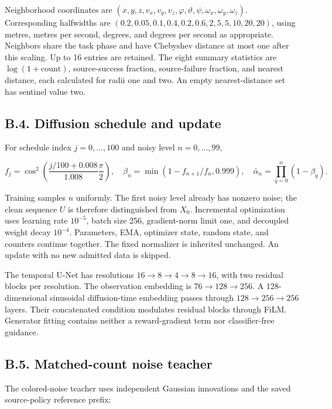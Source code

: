 \documentclass[
  american,
  11pt,
  a4paper,
]{article}
\begin{document}
Neighborhood coordinates are
\((x,y,z,v_x,v_y,v_z,\varphi,\vartheta,\psi,\omega_x,\omega_y,\omega_z)\).
Corresponding halfwidths are
\((0.2,0.05,0.1,0.4,0.2,0.6,2,5,5,10,20,20)\), using metres, metres per
second, degrees, and degrees per second as appropriate. Neighbors share
the task phase and have Chebyshev distance at most one after this
scaling. Up to 16 entries are retained. The eight summary statistics are
\(\log(1+\mathrm{count})\), source-success fraction, source-failure
fraction, and nearest distance, each calculated for radii one and two.
An empty nearest-distance set has sentinel value two.

\subsection{B.4. Diffusion schedule and
update}\label{b.4.-diffusion-schedule-and-update}

For schedule index \(j=0,\ldots,100\) and noisy level \(n=0,\ldots,99\),

\[
f_j=\cos^2\!\left(\frac{j/100+0.008}{1.008}\frac{\pi}{2}\right),\quad
\beta_n=\min(1-f_{n+1}/f_n,0.999),\quad
\bar\alpha_n=\prod_{q=0}^{n}(1-\beta_q).
\tag{60}\label{eq:60}
\]

Training samples \(n\) uniformly. The first noisy level already has
nonzero noise; the clean sequence \(U\) is therefore distinguished from
\(X_0\). Incremental optimization uses learning rate \(10^{-5}\), batch
size 256, gradient-norm limit one, and decoupled weight decay
\(10^{-4}\). Parameters, EMA, optimizer state, random state, and
counters continue together. The fixed normalizer is inherited unchanged.
An update with no new admitted data is skipped.

The temporal U-Net has resolutions
\(16\rightarrow8\rightarrow4\rightarrow8\rightarrow16\), with two
residual blocks per resolution. The observation embedding is
\(76\rightarrow128\rightarrow256\). A 128-dimensional sinusoidal
diffusion-time embedding passes through
\(128\rightarrow256\rightarrow256\) layers. Their concatenated condition
modulates residual blocks through FiLM. Generator fitting contains
neither a reward-gradient term nor classifier-free guidance.

\subsection{B.5. Matched-count noise
teacher}\label{b.5.-matched-count-noise-teacher}

The colored-noise teacher uses independent Gaussian innovations and the
saved source-policy reference prefix:
\end{document}
